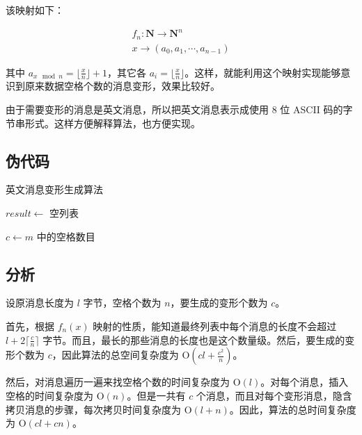 \documentclass[12pt,a4paper]{article}
\begin{document}
该映射如下：

\begin{gather*}
f_n: \mathbf{N} \to \mathbf{N}^n \\ 
x \to (a_0, a_1, \cdots, a_{n - 1})
\end{gather*}

其中 $ a_{x \mod n} = \lfloor \frac{x}{n} \rfloor + 1 $，其它各 $ a_i = \lfloor \frac{x}{n} \rfloor $。这样，就能利用这个映射实现能够意识到原来数据空格个数的消息变形，效果比较好。

由于需要变形的消息是英文消息，所以把英文消息表示成使用 8 位 ASCII 码的字节串形式。这样方便解释算法，也方便实现。

\subsection*{伪代码}

\begin{algorithm}[H]
\caption{英文消息变形生成算法}

$ {result} \leftarrow $ 空列表

$ c \leftarrow m $ 中的空格数目


\end{algorithm}

\subsection*{分析}

设原消息长度为 $ l $ 字节，空格个数为 $ n $，要生成的变形个数为 $ c $。

首先，根据 $ f_n(x) $ 映射的性质，能知道最终列表中每个消息的长度不会超过 $ l + 2 \lceil \frac{c}{n} \rceil $ 字节。而且，最长的那些消息的长度也是这个数量级。然后，要生成的变形个数为 $ c $，因此算法的总空间复杂度为 $ \mathrm{O}(c l + \frac{c^2}{n}) $。

然后，对消息遍历一遍来找空格个数的时间复杂度为 $ \mathrm{O}(l) $。对每个消息，插入空格的时间复杂度为 $ \mathrm{O}(n) $。但是一共有 $ c $ 个消息，而且对每个变形消息，隐含拷贝消息的步骤，每次拷贝时间复杂度为 $ \mathrm{O}(l + n) $。因此，算法的总时间复杂度为 $ \mathrm{O}(c l + c n) $。
\end{document}
